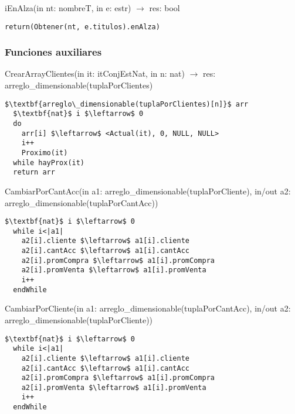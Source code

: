 iEnAlza(in nt: nombreT, in e: estr) $\rightarrow$ res: bool
\begin{lstlisting}[mathescape]
  return(Obtener(nt, e.titulos).enAlza)
\end{lstlisting}




\subsubsection{Funciones auxiliares}
CrearArrayClientes(in it: itConjEstNat, in n: nat) $\rightarrow$ res: arreglo\_dimensionable(tuplaPorClientes)
\begin{lstlisting}[mathescape]
  $\textbf{arreglo\_dimensionable(tuplaPorClientes)[n]}$ arr
  $\textbf{nat}$ i $\leftarrow$ 0
  do
    arr[i] $\leftarrow$ <Actual(it), 0, NULL, NULL>
    i++
    Proximo(it)
  while hayProx(it)
  return arr
\end{lstlisting}

CambiarPorCantAcc(in a1: arreglo\_dimensionable(tuplaPorCliente), in/out a2: arreglo\_dimensionable(tuplaPorCantAcc))
\begin{lstlisting}[mathescape]
  $\textbf{nat}$ i $\leftarrow$ 0
  while i<|a1|
    a2[i].cliente $\leftarrow$ a1[i].cliente
    a2[i].cantAcc $\leftarrow$ a1[i].cantAcc
    a2[i].promCompra $\leftarrow$ a1[i].promCompra
    a2[i].promVenta $\leftarrow$ a1[i].promVenta
    i++
  endWhile
\end{lstlisting}


CambiarPorCliente(in a1: arreglo\_dimensionable(tuplaPorCantAcc), in/out a2: arreglo\_dimensionable(tuplaPorCliente))
\begin{lstlisting}[mathescape]
  $\textbf{nat}$ i $\leftarrow$ 0
  while i<|a1|
    a2[i].cliente $\leftarrow$ a1[i].cliente
    a2[i].cantAcc $\leftarrow$ a1[i].cantAcc
    a2[i].promCompra $\leftarrow$ a1[i].promCompra
    a2[i].promVenta $\leftarrow$ a1[i].promVenta
    i++
  endWhile
\end{lstlisting}
